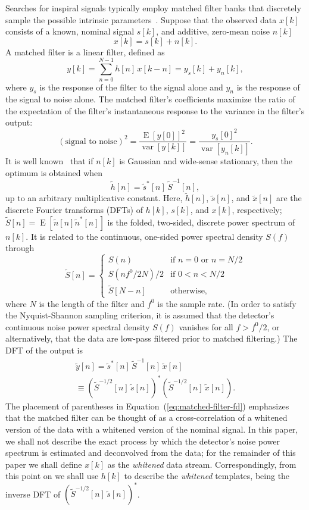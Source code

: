 \documentclass[preprint2]{aastex}
\DeclareMathOperator{\expectation}{E}
\DeclareMathOperator{\var}{var}
\begin{document}
Searches for inspiral signals typically employ matched filter
banks that discretely sample the possible intrinsic parameters~\citep{findchirppaper}.  Suppose that the observed data $x[k]$ consists of a known, nominal signal $s[k]$, and additive, zero-mean noise $n[k]$
%
$$
	x[k] = s[k] + n[k].
$$
%
A matched filter is a linear filter, defined as
%
$$
	y[k] = \sum_{n=0}^{N-1} h[n] \, x[k-n] = y_s[k] + y_n[k],
$$
%
where $y_s$ is the response of the filter to the signal alone and $y_n$ is the response of the signal to noise alone.  The matched filter's coefficients maximize the ratio of the expectation of the filter's instantaneous response to the variance in the filter's output:
%
$$
(\textrm{signal to noise})^2 = \frac{\expectation \left[ y[0] \right]^2}{\var \left[ y[k] \right]} = \frac{y_s[0]^2}{\var \left[ y_n[k] \right]}.
$$
%
It is well known~\citep[see, for example,][]{matched-filter} that if $n[k]$ is Gaussian and wide-sense stationary, then the optimum is obtained when
%
$$
\tilde{h}[n] = \tilde{s}^*[n] \, \tilde{S}^{-1}[n],
$$
%
up to an arbitrary multiplicative constant.  Here, $\tilde{h}[n]$, $\tilde{s}[n]$, and $\tilde{x}[n]$ are the discrete Fourier transforms (DFTs) of $h[k]$, $s[k]$, and $x[k]$, respectively; $\tilde{S}[n] = \expectation \left[ \tilde{n}[n] \tilde{n}^* [n] \right]$ is the folded, two-sided, discrete power spectrum of $n[k]$.  It is related to the continuous, one-sided power spectral density $S(f)$ through
$$
	\tilde{S}[n] =
	\begin{cases}
		S(n) & \textrm{if } n = 0 \textrm{ or } n = N / 2 \\
		S(n f^0 / 2 N) / 2 & \textrm{if } 0 < n < N / 2 \\
		\tilde{S}[N - n] & \textrm{otherwise},
	\end{cases}
$$
where $N$ is the length of the filter and $f^0$ is the sample rate.  (In order to satisfy the Nyquist-Shannon sampling criterion, it is assumed that the detector's continuous noise power spectral density $S(f)$ vanishes for all $f > f^0 / 2$, or alternatively, that the data are low-pass filtered prior to matched filtering.)  The DFT of the output is
%
\begin{multline}
\label{eq:matched-filter-fd}
\tilde{y}[n] = \tilde{s}^*[n] \, \tilde{S}^{-1}[n] \, \tilde{x}[n] \\
\equiv \left(\tilde{S}^{-1/2}[n] \, \tilde{s}[n]\right)^* \left(\tilde{S}^{-1/2}[n] \, \tilde{x}[n] \right).
\end{multline}
%
The placement of parentheses in Equation~(\ref{eq:matched-filter-fd}) emphasizes that the matched filter can be thought of as a cross-correlation of a whitened version of the data with a whitened version of the nominal signal.  In this paper, we shall not describe the exact process by which the detector's noise power spectrum is estimated and deconvolved from the data; for the remainder of this paper we shall define $x[k]$ as the \emph{whitened} data stream.  Correspondingly, from this point on we shall use $h[k]$ to describe the \emph{whitened} templates, being the inverse DFT of $\left(\tilde{S}^{-1/2}[n] \, \tilde{s}[n]\right)^*$.
\end{document}
